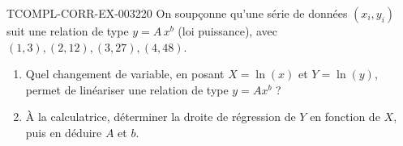 \begin{exercice}{TCOMPL-CORR-EX-003}{2}{20}
On soupçonne qu'une série de données $(x_i,y_i)$ suit une relation de type $y=A\,x^{b}$ (loi puissance), avec $(1,3),(2,12),(3,27),(4,48)$.
\begin{enumerate}
  \item Quel changement de variable, en posant $X=\ln(x)$ et $Y=\ln(y)$, permet de linéariser une relation de type $y=Ax^b$ ?
  \item À la calculatrice, déterminer la droite de régression de $Y$ en fonction de $X$, puis en déduire $A$ et $b$.
\end{enumerate}
\end{exercice}
